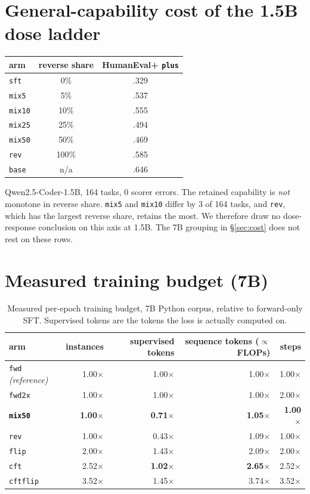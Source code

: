 \documentclass{article}
\newcommand{\arm}[1]{\texttt{#1}}
\begin{document}
\section{General-capability cost of the 1.5B dose ladder}
\label{app:dosecost}
\begin{center}\small
\begin{tabular}{lcc}
\toprule
arm & reverse share & HumanEval+ \texttt{plus} \\
\midrule
\arm{sft} & 0\% & .329 \\
\arm{mix5} & 5\% & .537 \\
\arm{mix10} & 10\% & .555 \\
\arm{mix25} & 25\% & .494 \\
\arm{mix50} & 50\% & .469 \\
\arm{rev} & 100\% & .585 \\
\arm{base} & n/a & .646 \\
\bottomrule
\end{tabular}
\end{center}
Qwen2.5-Coder-1.5B, 164 tasks, 0 scorer errors. The retained capability is \emph{not}
monotone in reverse share. \arm{mix5} and \arm{mix10} differ by 3 of 164 tasks, and
\arm{rev}, which has the largest reverse share, retains the most. We therefore draw no
dose-response conclusion on this axis at 1.5B. The 7B grouping in §\ref{sec:cost} does not
rest on these rows.

\section{Measured training budget (7B)}
\label{app:cost}
\begin{table}[h]
\centering\small
\caption{Measured per-epoch training budget, 7B Python corpus, relative to forward-only
SFT. Supervised tokens are the tokens the loss is actually computed on.}
\label{tab:cost}
\begin{tabular}{lrrrr}
\toprule
arm & instances & supervised tokens & sequence tokens ($\propto$ FLOPs) & steps \\
\midrule
\arm{fwd} \emph{(reference)} & 1.00$\times$ & 1.00$\times$ & 1.00$\times$ & 1.00$\times$ \\
\arm{fwd2x} & 1.00$\times$ & 1.00$\times$ & 1.00$\times$ & 2.00$\times$ \\
\textbf{\arm{mix50}} & \textbf{1.00$\times$} & \textbf{0.71$\times$} & \textbf{1.05$\times$} & \textbf{1.00$\times$} \\
\arm{rev} & 1.00$\times$ & 0.43$\times$ & 1.09$\times$ & 1.00$\times$ \\
\arm{flip} & 2.00$\times$ & 1.43$\times$ & 2.09$\times$ & 2.00$\times$ \\
\arm{cft} & 2.52$\times$ & \textbf{1.02$\times$} & \textbf{2.65$\times$} & 2.52$\times$ \\
\arm{cftflip} & 3.52$\times$ & 1.45$\times$ & 3.74$\times$ & 3.52$\times$ \\
\bottomrule
\end{tabular}
\end{table}
\end{document}
